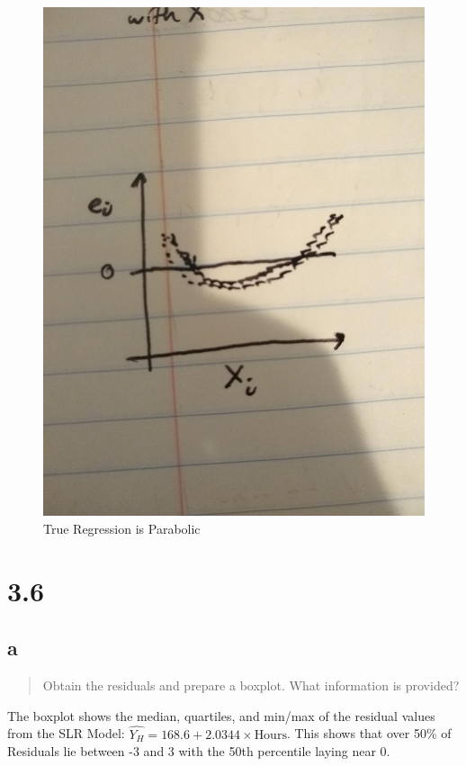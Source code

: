 \documentclass[11pt]{article}
\begin{document}
\begin{figure}[htbp]
\centering
\includegraphics[width=.9\linewidth]{./images/3.2_2.jpg}
\caption{\label{fig:org0772d0d}
True Regression is Parabolic}
\end{figure}

\section{3.6}
\label{sec:org94baad3}
\subsection{a}
\label{sec:org225ce07}
\begin{quote}
Obtain the residuals and prepare a boxplot. What information is provided?
\end{quote}

The boxplot shows the median, quartiles, and min/max of the residual values from
the SLR Model: \(\hat{Y_{H}} = 168.6 + 2.0344 \times \text{Hours}\). This shows
that over 50\% of Residuals lie between -3 and 3 with the 50th percentile laying
near 0.
\end{document}
